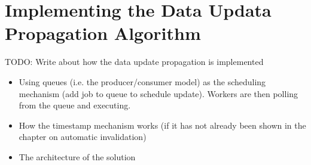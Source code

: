 



\section{Implementing the Data Updata Propagation Algorithm}
\label{sec:implementing-the-data-updata-propagation-algorithm}

TODO: Write about how the data update propagation is implemented

\begin{itemize}
  \item Using queues (i.e. the producer/consumer model) as the scheduling mechanism (add job to queue to schedule update). Workers are then polling from the queue and executing.
  \item How the timestamp mechanism works (if it has not already been shown in the chapter on automatic invalidation)
  \item The architecture of the solution
\end{itemize}


